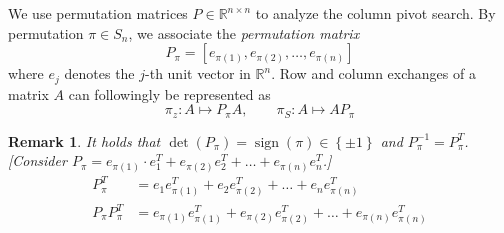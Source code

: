 \documentclass[a4paper]{article}
\numberwithin{lecref}{section}
\theoremstyle{break}
\newtheorem*{Remark}{Remark}
\newcommand{\Set}[1]{\left\{#1\right\}}
\DeclareMathOperator{\sign}{sign}
\begin{document}
We use permutation matrices $P \in \mathbb R^{n \times n}$ to analyze the column pivot search.
By permutation $\pi \in S_n$, we associate the \emph{permutation matrix}
\[ P_\pi = [e_{\pi(1)}, e_{\pi(2)}, \dots, e_{\pi(n)}] \]
where $e_j$ denotes the $j$-th unit vector in $\mathbb R^n$. Row and column exchanges of a matrix $A$ can followingly be represented as
\[ \pi_z: A \mapsto P_{\pi} A, \qquad \pi_S: A \mapsto A P_{\pi} \]

\begin{Remark}
  It holds that $\det(P_{\pi}) = \sign(\pi) \in \Set{\pm 1}$ and $P_{\pi}^{-1} = P_{\pi}^{T}$.
  [Consider $P_\pi = e_{\pi(1)} \cdot e_1^T + e_{\pi(2)} e_2^T + \dots + e_{\pi(n)} e_n^T$.]
  \begin{align*}
    P_{\pi}^T &= e_1 e_{\pi(1)}^T + e_2 e_{\pi(2)}^T + \dots + e_n e_{\pi(n)}^T \\
    P_{\pi} P_{\pi}^T &= e_{\pi(1)} e_{\pi(1)}^T + e_{\pi(2)} e_{\pi(2)}^T + \dots + e_{\pi(n)} e_{\pi(n)}^T
  \end{align*}
\end{Remark}
\end{document}
